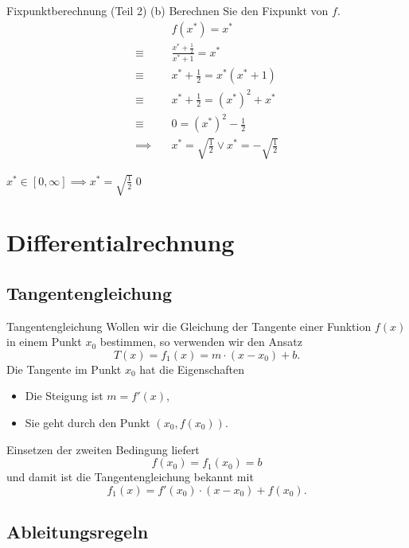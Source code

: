 \documentclass[german]{../spicker}
\begin{document}
\begin{example}{Fixpunktberechnung (Teil 2)}
    (b) Berechnen Sie den Fixpunkt von $f$.
    $$
        \begin{aligned}
                           & f(x^*) = x^*                                            \\
            \equiv \quad   & \frac{x^*+\frac{1}{2}}{x^*+1} = x^*                     \\
            \equiv \quad   & x^*+\frac{1}{2} = x^*(x^*+1)                            \\
            \equiv \quad   & x^*+\frac{1}{2} = (x^*)^2+x^*                           \\
            \equiv \quad   & 0 = (x^*)^2-\frac{1}{2}                                 \\
            \implies \quad & x^* = \sqrt{\frac{1}{2}} \lor x^* = -\sqrt{\frac{1}{2}}
        \end{aligned}
    $$

    $x^* \in [0,\infty] \implies x^* = \sqrt{\frac{1}{2}}$\qed
\end{example}

\section{Differentialrechnung}
\subsection{Tangentengleichung}

\begin{algo}{Tangentengleichung}
    Wollen wir die Gleichung der Tangente einer Funktion $f(x)$ in einem Punkt $x_0$ bestimmen, so verwenden wir den Ansatz
    $$
        T(x) = f_1(x) = m \cdot (x-x_0) + b.
    $$
    Die Tangente im Punkt $x_0$ hat die Eigenschaften
    \begin{itemize}
        \item Die Steigung ist $m = f'(x)$,
        \item Sie geht durch den Punkt $(x_0, f(x_0))$.
    \end{itemize}

    Einsetzen der zweiten Bedingung liefert
    $$
        f(x_0) = f_1(x_0) = b
    $$
    und damit ist die Tangentengleichung bekannt mit
    $$
        f_1(x) = f'(x_0) \cdot (x-x_0) + f(x_0).
    $$
\end{algo}

\newpage
\subsection{Ableitungsregeln}
\end{document}
